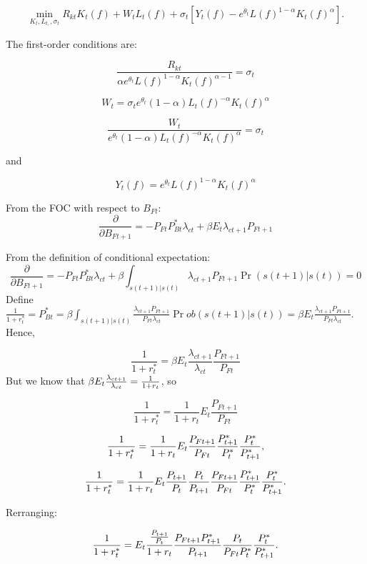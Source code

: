 \documentclass{article}
\begin{document}
\[
\min_{K_{t},L_{t,},\sigma _{t}}R_{kt}K_{t}(f)+W_{t}L_{t}(f)+\sigma _{t}\left[
Y_{t}(f)-e^{\theta _{t}}L(f)^{1-\alpha }K_{t}(f)^{\alpha }\right] .
\]

The first-order conditions are:

\[
\frac{R_{kt}}{\alpha e^{\theta _{t}}L(f)^{1-\alpha }K_{t}(f)^{\alpha -1}}%
=\sigma _{t}
\]

\[
W_{t}=\sigma _{t}e^{\theta _{t}}(1-\alpha )L_{t}(f)^{-\alpha
}K_{t}(f)^{\alpha }
\]

\[
\frac{W_{t}}{e^{\theta _{t}}(1-\alpha )L_{t}(f)^{-\alpha }K_{t}(f)^{\alpha }}%
=\sigma _{t}
\]

and

\[
Y_{t}(f)=e^{\theta _{t}}L(f)^{1-\alpha }K_{t}(f)^{\alpha } 
\]

\bigskip

\bigskip From the FOC with respect to $B_{Ft}$:%
\[
\frac{\partial }{\partial B_{Ft+1}}=-P_{Ft}P_{Bt}^{\ast }\lambda _{ct}+\beta
E_{t}\lambda _{ct+1}P_{Ft+1} 
\]

\bigskip From the definition of conditional expectation:%
\[
\frac{\partial }{\partial B_{Ft+1}}=-P_{Ft}P_{Bt}^{\ast }\lambda _{ct}+\beta
\int_{s(t+1)|s(t)}\lambda _{ct+1}P_{Ft+1}\Pr (s(t+1)|s(t))=0 
\]%
Define $\frac{1}{1+r_{t}^{\ast }}=P_{Bt}^{\ast }=\beta \int_{s(t+1)|s(t)}%
\frac{\lambda _{ct+1}P_{Ft+1}}{P_{Ft}\lambda _{ct}}\Pr ob(s(t+1)|s(t))=\beta
E_{t}\frac{\lambda _{ct+1}P_{Ft+1}}{P_{Ft}\lambda _{ct}}.$ Hence,

\[
\frac{1}{1+r_{t}^{\ast }}=\beta E_{t}\frac{\lambda _{ct+1}}{\lambda _{ct}}%
\frac{P_{Ft+1}}{P_{Ft}} 
\]%
But we know that $\beta E_{t}\frac{\lambda _{ct+1}}{\lambda _{ct}}=\frac{1}{%
1+r_{t}}$, so

\[
\frac{1}{1+r_{t}^{\ast }}=\frac{1}{1+r_{t}}E_{t}\frac{P_{Ft+1}}{P_{Ft}} 
\]

\bigskip 
\[
\frac{1}{1+r_{t}^{\ast }}=\frac{1}{1+r_{t}}E_{t}\frac{P_{Ft+1}}{P_{Ft}}\frac{%
P_{t+1}^{\ast }}{P_{t}^{\ast }}\frac{P_{t}^{\ast }}{P_{t+1}^{\ast }}, 
\]

\[
\frac{1}{1+r_{t}^{\ast }}=\frac{1}{1+r_{t}}E_{t}\frac{P_{t+1}}{P_{t}}\frac{%
P_{t}}{P_{t+1}}\frac{P_{Ft+1}}{P_{Ft}}\frac{P_{t+1}^{\ast }}{P_{t}^{\ast }}%
\frac{P_{t}^{\ast }}{P_{t+1}^{\ast }}. 
\]

Rerranging:

\[
\frac{1}{1+r_{t}^{\ast }}=E_{t}\frac{\frac{P_{t+1}}{P_{t}}}{1+r_{t}}\frac{%
P_{Ft+1}P_{t+1}^{\ast }}{P_{t+1}}\frac{P_{t}}{P_{Ft}P_{t}^{\ast }}\frac{%
P_{t}^{\ast }}{P_{t+1}^{\ast }}. 
\]
\end{document}
